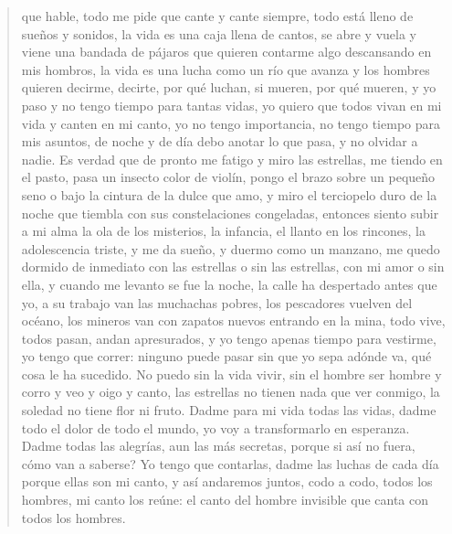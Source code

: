 \documentclass[12pt]{article}
\begin{document}
\begin{verse}
que hable,
todo me pide
que cante y cante siempre,
todo está lleno
de sueños y sonidos,
la vida es una caja
llena de cantos, se abre
y vuela y viene
una bandada
de pájaros
que quieren contarme algo
descansando en mis hombros,
la vida es una lucha
como un río que avanza
y los hombres
quieren decirme,
decirte,
por qué luchan,
si mueren,
por qué mueren,
y yo paso y no tengo
tiempo para tantas vidas,
yo quiero
que todos vivan
en mi vida
y canten en mi canto,
yo no tengo importancia,
no tengo tiempo
para mis asuntos,
de noche y de día
debo anotar lo que pasa,
y no olvidar a nadie.
Es verdad que de pronto
me fatigo
y miro las estrellas,
me tiendo en el pasto, pasa
un insecto color de violín,
pongo el brazo
sobre un pequeño seno
o bajo la cintura
de la dulce que amo,
y miro el terciopelo
duro
de la noche que tiembla
con sus constelaciones congeladas,
entonces
siento subir a mi alma
la ola de los misterios,
la infancia,
el llanto en los rincones,
la adolescencia triste,
y me da sueño,
y duermo
como un manzano,
me quedo dormido
de inmediato
con las estrellas o sin las estrellas,
con mi amor o sin ella,
y cuando me levanto
se fue la noche,
la calle ha despertado antes que yo,
a su trabajo
van las muchachas pobres,
los pescadores vuelven
del océano,
los mineros
van con zapatos nuevos
entrando en la mina,
todo vive,
todos pasan,
andan apresurados,
y yo tengo apenas tiempo
para vestirme,
yo tengo que correr:
ninguno puede
pasar sin que yo sepa
adónde va, qué cosa
le ha sucedido.
No puedo
sin la vida vivir,
sin el hombre ser hombre
y corro y veo y oigo
y canto,
las estrellas no tienen
nada que ver conmigo,
la soledad no tiene
flor ni fruto.
Dadme para mi vida
todas las vidas,
dadme todo el dolor
de todo el mundo,
yo voy a transformarlo
en esperanza.
Dadme
todas las alegrías,
aun las más secretas,
porque si así no fuera,
cómo van a saberse?
Yo tengo que contarlas,
dadme
las luchas
de cada día
porque ellas son mi canto,
y así andaremos juntos,
codo a codo,
todos los hombres,
mi canto los reúne:
el canto del hombre invisible
que canta con todos los hombres.

\end{verse}
\end{document}
